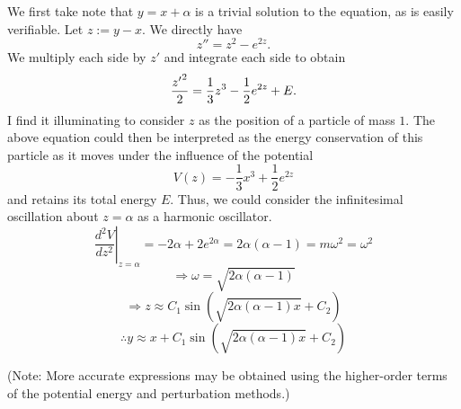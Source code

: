 \item
We first take note that $y = x + \alpha$ is a trivial solution to the equation, as is easily verifiable.
Let $z := y - x$.
We directly have
\[
	z'' = z^2 - e^{2z}.
\]
We multiply each side by $z'$ and integrate each side to obtain
\[
	\frac{{z'}^2}{2} = \frac{1}{3}z^3 - \frac{1}{2} e^{2z} + E.
\]
I find it illuminating to consider $z$ as the position of a particle of mass $1$.
The above equation could then be interpreted as the energy conservation of this particle as it moves under the influence of the potential
\[
	V(z) = -\frac{1}{3}x^3 + \frac{1}{2}e^{2z}
\]
and retains its total energy $E$.
Thus, we could consider the infinitesimal oscillation about $z=\alpha$ as a harmonic oscillator.
\[
	\left. \frac{d^2 V}{dz^2} \right|_{z = \alpha}
	= -2\alpha + 2e^{2\alpha} = 2\alpha (\alpha - 1)
	= m\omega^2 = \omega^2
\]
\[
	\Rightarrow \omega = \sqrt{2\alpha(\alpha - 1)}
\]
\[
	\Rightarrow z \approx C_1 \sin \left(
	\sqrt{2\alpha (\alpha - 1) x} + C_2
	\right)
\]
\[
	\therefore y \approx x + C_1 \sin \left(
	\sqrt{2\alpha (\alpha - 1) x} + C_2
	\right)
\]

(Note: More accurate expressions may be obtained using the higher-order terms of the potential energy and perturbation methods.)